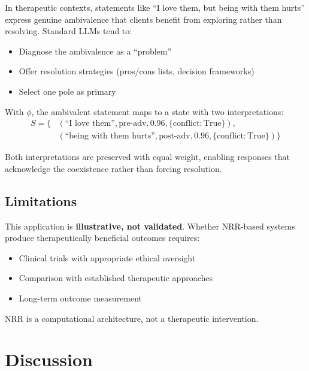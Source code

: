 \documentclass[11pt,a4paper]{article}
\begin{document}
In therapeutic contexts, statements like ``I love them, but being with them hurts'' 
express genuine ambivalence that clients benefit from exploring rather than resolving. 
Standard LLMs tend to:
\begin{itemize}
    \item Diagnose the ambivalence as a ``problem''
    \item Offer resolution strategies (pros/cons lists, decision frameworks)
    \item Select one pole as primary
\end{itemize}

With $\phi$, the ambivalent statement maps to a state with two interpretations:
\begin{align*}
S = \{&(\text{``I love them''}, \text{pre-adv}, 0.96, \{\text{conflict}: \text{True}\}), \\
      &(\text{``being with them hurts''}, \text{post-adv}, 0.96, \{\text{conflict}: \text{True}\})\}
\end{align*}

Both interpretations are preserved with equal weight, enabling responses that 
acknowledge the coexistence rather than forcing resolution.

\subsection{Limitations}

This application is \textbf{illustrative, not validated}. Whether NRR-based systems 
produce therapeutically beneficial outcomes requires:
\begin{itemize}
    \item Clinical trials with appropriate ethical oversight
    \item Comparison with established therapeutic approaches
    \item Long-term outcome measurement
\end{itemize}

NRR is a computational architecture, not a therapeutic intervention.

\section{Discussion}
\label{sec:discussion}
\end{document}
